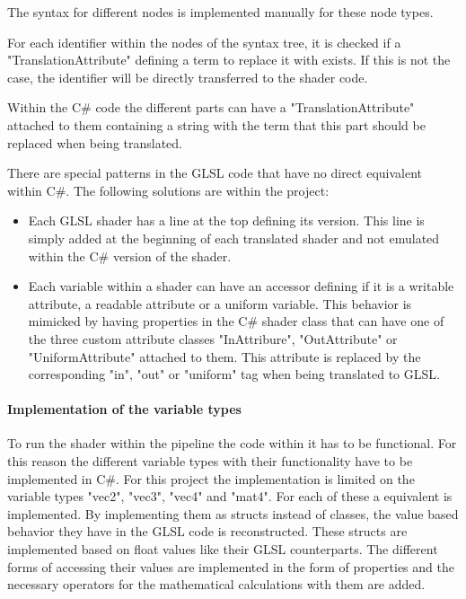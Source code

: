 The syntax for different nodes is implemented manually for these node types.

For each identifier within the nodes of the syntax tree, it is checked if a "TranslationAttribute" defining a term to replace it with exists. If this is not the case, the identifier will be directly transferred to the shader code.

Within the C\# code the different parts can have a "TranslationAttribute" attached to them containing a string with the term that this part should be replaced when being translated.

There are special patterns in the GLSL code that have no direct equivalent within C\#. The following solutions are within the project:
\begin{itemize}
\item Each GLSL shader has a line at the top defining its version. This line is simply added at the beginning of each translated shader and not emulated within the C\# version of the shader.
\item Each variable within a shader can have an accessor defining if it is a writable attribute, a readable attribute or a uniform variable. This behavior is mimicked by having properties in the C\# shader class that can have one of the three custom attribute classes "InAttribure", "OutAttribute" or "UniformAttribute" attached to them. This attribute is replaced by the corresponding "in", "out" or "uniform" tag when being translated to GLSL.
\end{itemize}

\paragraph{Implementation of the variable types}

To run the shader within the pipeline the code within it has to be functional. For this reason the different variable types with their functionality have to be implemented in C\#. For this project the implementation is limited on the variable types "vec2", "vec3", "vec4" and "mat4". For each of these a equivalent is implemented. By implementing them as structs instead of classes, the value based behavior they have in the GLSL code is reconstructed. These structs are implemented based on float values like their GLSL counterparts. The different forms of accessing their values are implemented in the form of properties and the necessary operators for the mathematical calculations with them are added.

